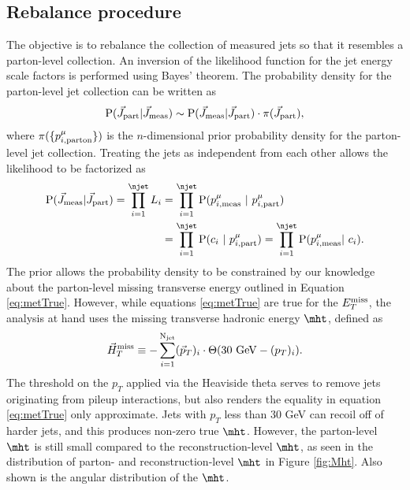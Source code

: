 \subsection{Rebalance procedure}
The objective is to rebalance the collection of measured jets so that it resembles a parton-level collection. An inversion of the likelihood function for the jet energy scale factors is performed using Bayes' theorem. The probability density for the parton-level jet collection can be written as
\begin{equation}
{\rm P}(\vec{J}_{\rm part}|\vec{J}_{\rm meas}) \sim {\rm P}(\vec{J}_{\rm meas}|\vec{J}_{\rm part})\cdot \pi(\vec{J}_{\rm part}),
\label{eq:posterior1}
\end{equation}
where $\pi(\{p^{\mu}_{i,\rm parton}\})$ is the $n$-dimensional prior probability density for the parton-level jet collection.
Treating the jets as independent from each other allows the likelihood to be factorized as
\begin{align}
\begin{split}
{\rm P}(\vec{J}_{\rm meas}|\vec{J}_{\rm part}) = \prod_{i=1}^{\njet}L_{i} &= \prod_{i=1}^{\njet}{\rm P}(p^{\mu}_{i,\rm meas}\ |\ p^{\mu}_{i,\rm part})\\
&= \prod_{i=1}^{\njet}{\rm P}(c_i\ |\ p^{\mu}_{i,\rm part})=\prod_{i=1}^{\njet}{\rm P}(p^{\mu}_{i,\rm meas}|\ c_{i}).
\end{split}
\label{eq:likelihood1}
\end{align}
The prior allows the probability density to be constrained by our knowledge about the parton-level missing transverse energy outlined in Equation \ref{eq:metTrue}. However, while equations \ref{eq:metTrue} are true for the $E_{T}^{\rm miss}$, the analysis at hand uses the missing transverse hadronic energy $\mht$, defined as
\begin{equation}
\vec{H}_{T}^{\rm miss} \equiv -\sum_{i=1}^{{\rm N}_{\rm jet}}(\vec{p}_{T})_{i}\cdot\Theta(30{\rm\ GeV}-(p_{T})_{i}).
\end{equation}
The threshold on the $p_{T}$ applied via the Heaviside theta serves to remove jets originating from pileup interactions, but also renders the equality in equation \ref{eq:metTrue} only approximate. Jets with $p_{T}$ less than 30 GeV can recoil off of harder jets, and this produces non-zero true $\mht$. However, the parton-level $\mht$ is still small compared to the reconstruction-level $\mht$, as seen in the distribution of parton- and reconstruction-level $\mht$ in Figure \ref{fig:Mht}. Also shown is the angular distribution of the $\mht$.
